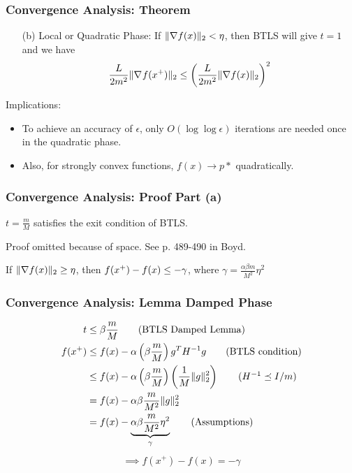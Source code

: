 \documentclass{beamer}
\newcommand{\be}{\begin{eqnarray}}
\newcommand{\ee}{\end{eqnarray}}
\begin{document}
\begin{frame}
    \frametitle{Convergence Analysis: Theorem}    
    \begin{theorem}[Part II]
        \begin{itemize}
            \item[(b)] Local or Quadratic Phase: If $\|\nabla f(x)\|_2 < \eta$,
                then BTLS will give $t = 1$ and we have
                \be
                \frac{L}{2m^2} \|\gradient{}{f}{\xp}\|_2 \leq 
                    \bigg(\frac{L}{2m^2} \|\fgrad\|_2 \bigg)^2
                \ee
        \end{itemize}
    \end{theorem}
    Implications:
    \begin{itemize}
    \item To achieve an accuracy of $\epsilon$, only $O(\log \log \epsilon)$ iterations are needed once in the quadratic phase.
    \item Also, for strongly convex functions, $f(x) \to p*$ quadratically.
    \end{itemize}
\end{frame}

\begin{frame}
    \frametitle{Convergence Analysis: Proof Part (a)}    
    \begin{lemma}
        $t = \frac{m}{M}$ satisfies the exit condition of BTLS.
    \end{lemma}
    Proof omitted because of space.  See p. 489-490 in Boyd.
    \begin{lemma}
        If $\|\nabla f(x)\|_2 \geq \eta$, 
        then $f(x^{+}) - f(x) \leq -\gamma$, 
        where  $\gamma = \frac{\alpha \beta m}{M^2}\eta^2$
    \end{lemma}
\end{frame}

\begin{frame}
    \frametitle{Convergence Analysis: Lemma Damped Phase}    
	\begin{align}
	t &\leq \beta \frac{m}{M} \tag{BTLS Damped Lemma} \\
	f(x^+) &\leq f(x) - \alpha\left(\beta \frac{m}{M} \right) g^T H^{-1} g \tag{BTLS condition} \\
	&\leq f(x) - \alpha\left(\beta \frac{m}{M} \right) \left(\frac{1}{M}\|g\|_2^2 \right) \tag{$H^{-1} \preceq I/m$} \\
	&= f(x) - \alpha\beta \frac{m}{M^2}\|g\|_2^2 \notag \\
	&= f(x) - \underbrace{\alpha\beta \frac{m}{M^2} \eta^2}_{\gamma} \tag{Assumptions}
	\end{align}  
	\begin{align}
	\implies f(x^+) - f(x) = - \gamma
	\end{align}
\end{frame}
\end{document}
